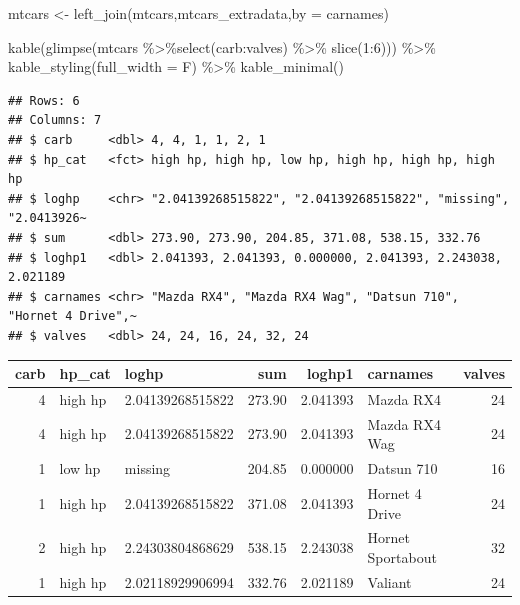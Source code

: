 \documentclass[
]{article}
\newenvironment{Shaded}{\begin{snugshade}}{\end{snugshade}}
\newcommand{\AttributeTok}[1]{\textcolor[rgb]{0.77,0.63,0.00}{#1}}
\newcommand{\DecValTok}[1]{\textcolor[rgb]{0.00,0.00,0.81}{#1}}
\newcommand{\FunctionTok}[1]{\textcolor[rgb]{0.00,0.00,0.00}{#1}}
\newcommand{\NormalTok}[1]{#1}
\newcommand{\OtherTok}[1]{\textcolor[rgb]{0.56,0.35,0.01}{#1}}
\newcommand{\SpecialCharTok}[1]{\textcolor[rgb]{0.00,0.00,0.00}{#1}}
\newcommand{\StringTok}[1]{\textcolor[rgb]{0.31,0.60,0.02}{#1}}
\begin{document}
\begin{Shaded}
\begin{Highlighting}[]
\NormalTok{mtcars }\OtherTok{\textless{}{-}} \FunctionTok{left\_join}\NormalTok{(mtcars,mtcars\_extradata,}\AttributeTok{by =} \StringTok{\textquotesingle{}carnames\textquotesingle{}}\NormalTok{)}

\FunctionTok{kable}\NormalTok{(}\FunctionTok{glimpse}\NormalTok{(mtcars }\SpecialCharTok{\%\textgreater{}\%}\FunctionTok{select}\NormalTok{(carb}\SpecialCharTok{:}\NormalTok{valves) }\SpecialCharTok{\%\textgreater{}\%}  \FunctionTok{slice}\NormalTok{(}\DecValTok{1}\SpecialCharTok{:}\DecValTok{6}\NormalTok{))) }\SpecialCharTok{\%\textgreater{}\%}
  \FunctionTok{kable\_styling}\NormalTok{(}\AttributeTok{full\_width =}\NormalTok{ F) }\SpecialCharTok{\%\textgreater{}\%}
  \FunctionTok{kable\_minimal}\NormalTok{()}
\end{Highlighting}
\end{Shaded}

\begin{verbatim}
## Rows: 6
## Columns: 7
## $ carb     <dbl> 4, 4, 1, 1, 2, 1
## $ hp_cat   <fct> high hp, high hp, low hp, high hp, high hp, high hp
## $ loghp    <chr> "2.04139268515822", "2.04139268515822", "missing", "2.0413926~
## $ sum      <dbl> 273.90, 273.90, 204.85, 371.08, 538.15, 332.76
## $ loghp1   <dbl> 2.041393, 2.041393, 0.000000, 2.041393, 2.243038, 2.021189
## $ carnames <chr> "Mazda RX4", "Mazda RX4 Wag", "Datsun 710", "Hornet 4 Drive",~
## $ valves   <dbl> 24, 24, 16, 24, 32, 24
\end{verbatim}

\begin{table}
\centering
\begin{tabular}{r|l|l|r|r|l|r}
\hline
carb & hp\_cat & loghp & sum & loghp1 & carnames & valves\\
\hline
4 & high hp & 2.04139268515822 & 273.90 & 2.041393 & Mazda RX4 & 24\\
\hline
4 & high hp & 2.04139268515822 & 273.90 & 2.041393 & Mazda RX4 Wag & 24\\
\hline
1 & low hp & missing & 204.85 & 0.000000 & Datsun 710 & 16\\
\hline
1 & high hp & 2.04139268515822 & 371.08 & 2.041393 & Hornet 4 Drive & 24\\
\hline
2 & high hp & 2.24303804868629 & 538.15 & 2.243038 & Hornet Sportabout & 32\\
\hline
1 & high hp & 2.02118929906994 & 332.76 & 2.021189 & Valiant & 24\\
\hline
\end{tabular}
\end{table}
\end{document}
